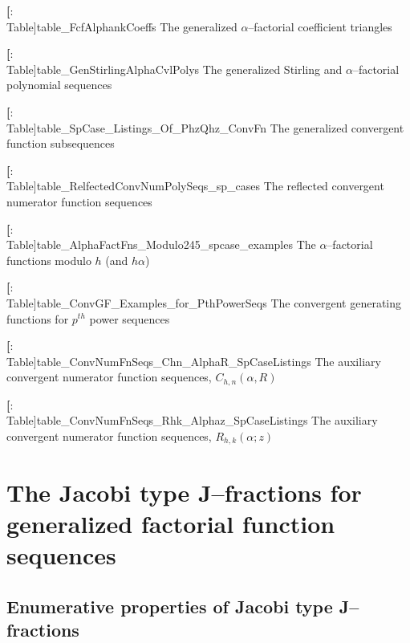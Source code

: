 \documentclass[12pt,reqno]{article}
\numberwithin{sfootnote}{section}
\numberwithin{equation}{section}
\newcommand{\itemlabel}[1]{\textbf{#1}: \\ }
\theoremstyle{DefaultTheoremStyle}
\theoremstyle{definition}
\begin{document}
\begin{enumerate}[leftmargin=\parindent,itemsep=-1mm]
\begin{enumerate}[leftmargin=\parindent,itemsep=-1mm]
\itemlabel[Table]{table_FcfAlphankCoeffs}{
     The generalized $\alpha$--factorial coefficient triangles} %

\itemlabel[Table]{table_GenStirlingAlphaCvlPolys}{ 
     The generalized Stirling and 
     $\alpha$--factorial polynomial sequences} %

\itemlabel[Table]{table_SpCase_Listings_Of_PhzQhz_ConvFn}{
     The generalized convergent function subsequences} 

\itemlabel[Table]{table_RelfectedConvNumPolySeqs_sp_cases}{
     The reflected convergent numerator function sequences} 

\itemlabel[Table]{table_AlphaFactFns_Modulo245_spcase_examples}{
     The $\alpha$--factorial functions modulo $h$ (and $h\alpha$)} 

\itemlabel[Table]{table_ConvGF_Examples_for_PthPowerSeqs}{
     The convergent generating functions for 
     $p^{th}$ power sequences} 

\itemlabel[Table]{table_ConvNumFnSeqs_Chn_AlphaR_SpCaseListings}{
     The auxiliary convergent numerator function sequences, 
     $C_{h,n}(\alpha, R)$} 

\itemlabel[Table]{table_ConvNumFnSeqs_Rhk_Alphaz_SpCaseListings}{
     The auxiliary convergent numerator function sequences, 
     $R_{h,k}(\alpha; z)$} 

\end{enumerate} 

\end{enumerate} 

\section{The Jacobi type J--fractions for 
         generalized factorial function sequences} 
\label{Section_Proofs_of_the_GenCFracReps} 

\subsection{Enumerative properties of 
            Jacobi type J--fractions}
\label{subSection_EnumProps_of_JFractions} 
\end{document}
